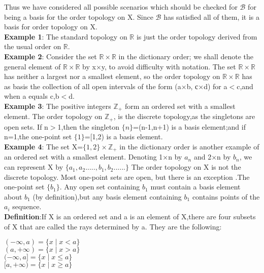 \documentclass[a4paper,english,12pt]{article}
\begin{document}
\begin{flushleft}
Thus we have considered all possible scenarios which should be checked for $\mathscr{B}$ for being a basis for the order topology on X. Since $\mathscr{B}$ has satisfied all of them, it is a basis for order topology on X.\\
\vspace{1mm}
{\bf Example 1}: The standard topology on $\mathbb{R}$ is just the order topology derived from the usual order on $\mathbb{R}$.\\
\vspace{1mm}
{\bf Example 2}: Consider the set $\mathbb{R}\times\mathbb{R}$ in the dictionary order; we shall denote the general element of $\mathbb{R}\times\mathbb{R}$ by x$\times$y, to avoid difficulty with notation. The set $\mathbb{R}\times\mathbb{R}$ has neither a
largest nor a smallest element, so the order topology on $\mathbb{R}\times\mathbb{R}$ has as basis the collection of all open intervals of the form (a$\times$b, с$\times$d) for a$<$c,and when a equals c,b$<$d.\\
{\bf Example 3}: The positive integers $\mathbb{Z}_+$ form an ordered set with a smallest element. The order topology on $\mathbb{Z}_+$, is the discrete topology,as the singletons are open sets. If n$>$1,then the singleton $\{n\}$=(n-1,n+1) is a basis element;and if n=1,the one-point set $\{1\}$=[1,2) is a basis element.\\
{\bf Example 4}: The set X=$\{1,2\}\times\mathbb{Z}_+$ in the dictionary order is another example of an ordered set with a smallest element. Denoting 1$\times$n by $a_n$ and 2$\times$n by $b_n$, we can represent X by $\{a_1,a_2.....,b_1,b_2......\}$
The order topology on X is not the discrete topology. Most one-point sets are open, but
there is an exception .The one-point set $\{b_1\}$. Any open set containing $b_1$ must contain a basis element about $b_1$ (by definition),but any basis element containing $b_1$ contains points of the $a_i$ sequence.\\
\vspace{2mm}
{\bf Definition}:If X is an ordered set and a is an element of X,there are four subsets of X that are called the rays determined by a. They are the following:\\
\begin{center}
$(-\infty,a)=\{x\mid x<a\}$\\
$(a,+\infty)=\{x\mid x>a\}$\\
$(-\infty,a]=\{x\mid x\leq a\}$\\
$[a,+\infty)=\{x\mid x\geq a\}$\\
\end{center}


\end{flushleft}
\end{document}

